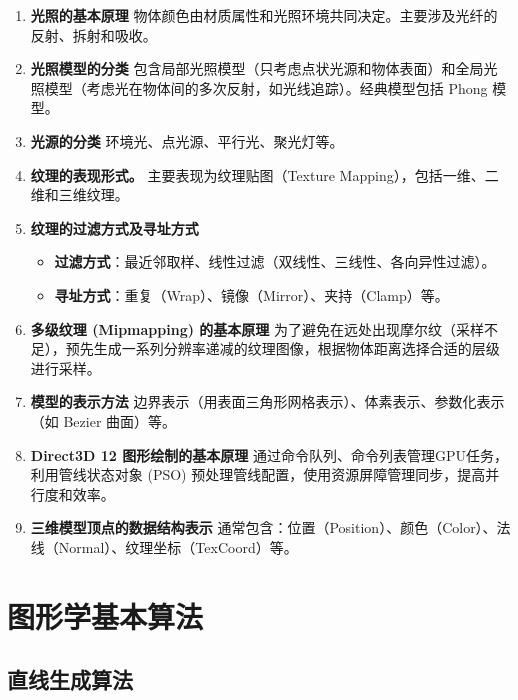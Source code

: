 \documentclass[UTF8]{ctexart}
\begin{document}
\begin{enumerate}
    \item \textbf{光照的基本原理}
    物体颜色由材质属性和光照环境共同决定。主要涉及光纤的反射、拆射和吸收。

    \item \textbf{光照模型的分类}
    包含局部光照模型（只考虑点状光源和物体表面）和全局光照模型（考虑光在物体间的多次反射，如光线追踪）。经典模型包括 Phong 模型。

    \item \textbf{光源的分类}
    环境光、点光源、平行光、聚光灯等。

    \item \textbf{纹理的表现形式。}
    主要表现为纹理贴图（Texture Mapping），包括一维、二维和三维纹理。

    \item \textbf{纹理的过滤方式及寻址方式}
    \begin{itemize}
        \item \textbf{过滤方式}：最近邻取样、线性过滤（双线性、三线性、各向异性过滤）。
        \item \textbf{寻址方式}：重复（Wrap）、镜像（Mirror）、夹持（Clamp）等。
    \end{itemize}

    \item \textbf{多级纹理 (Mipmapping) 的基本原理}
    为了避免在远处出现摩尔纹（采样不足），预先生成一系列分辨率递减的纹理图像，根据物体距离选择合适的层级进行采样。

    \item \textbf{模型的表示方法}
    边界表示（用表面三角形网格表示）、体素表示、参数化表示（如 Bezier 曲面）等。

    \item \textbf{Direct3D 12 图形绘制的基本原理}
    通过命令队列、命令列表管理GPU任务，利用管线状态对象 (PSO) 预处理管线配置，使用资源屏障管理同步，提高并行度和效率。

    \item \textbf{三维模型顶点的数据结构表示}
    通常包含：位置（Position）、颜色（Color）、法线（Normal）、纹理坐标（TexCoord）等。
\end{enumerate}

\section{图形学基本算法}

\subsection{直线生成算法}
\end{document}
